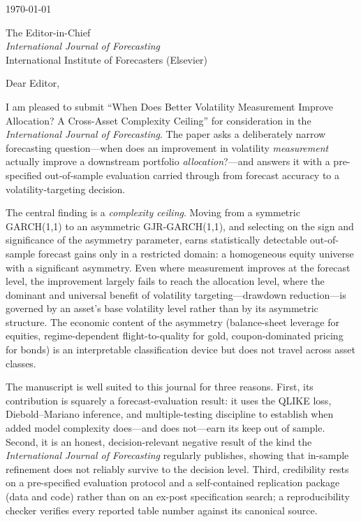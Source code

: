 \documentclass[11pt,a4paper]{article}
\begin{document}
\noindent
\today

\bigskip

\noindent
The Editor-in-Chief\\
\textit{International Journal of Forecasting}\\
International Institute of Forecasters (Elsevier)

\bigskip

\noindent
Dear Editor,

\medskip

I am pleased to submit ``When Does Better Volatility Measurement Improve Allocation? A Cross-Asset Complexity Ceiling'' for consideration in the \textit{International Journal of Forecasting}. The paper asks a deliberately narrow forecasting question---when does an improvement in volatility \emph{measurement} actually improve a downstream portfolio \emph{allocation}?---and answers it with a pre-specified out-of-sample evaluation carried through from forecast accuracy to a volatility-targeting decision.

The central finding is a \emph{complexity ceiling}. Moving from a symmetric GARCH(1,1) to an asymmetric GJR-GARCH(1,1), and selecting on the sign and significance of the asymmetry parameter, earns statistically detectable out-of-sample forecast gains only in a restricted domain: a homogeneous equity universe with a significant asymmetry. Even where measurement improves at the forecast level, the improvement largely fails to reach the allocation level, where the dominant and universal benefit of volatility targeting---drawdown reduction---is governed by an asset's base volatility level rather than by its asymmetric structure. The economic content of the asymmetry (balance-sheet leverage for equities, regime-dependent flight-to-quality for gold, coupon-dominated pricing for bonds) is an interpretable classification device but does not travel across asset classes.

The manuscript is well suited to this journal for three reasons. First, its contribution is squarely a forecast-evaluation result: it uses the QLIKE loss, Diebold--Mariano inference, and multiple-testing discipline to establish when added model complexity does---and does not---earn its keep out of sample. Second, it is an honest, decision-relevant negative result of the kind the \textit{International Journal of Forecasting} regularly publishes, showing that in-sample refinement does not reliably survive to the decision level. Third, credibility rests on a pre-specified evaluation protocol and a self-contained replication package (data and code) rather than on an ex-post specification search; a reproducibility checker verifies every reported table number against its canonical source.
\end{document}
